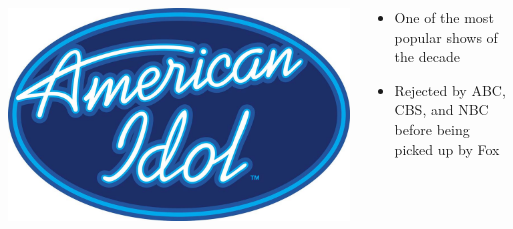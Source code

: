 \documentclass[aspectratio=169]{beamer}
\begin{document}
\begin{frame}

  \begin{columns}
     \begin{block}{}
       \includegraphics[width=\textwidth]{figures/american-idol}
     \end{block}

     \begin{block}{}
       \begin{itemize}
         \item One of the most popular shows of the decade
         \item Rejected by ABC, CBS, and NBC before being picked up by Fox
       \end{itemize}
     \end{block}
  \end{columns}

\end{frame}
\end{document}
